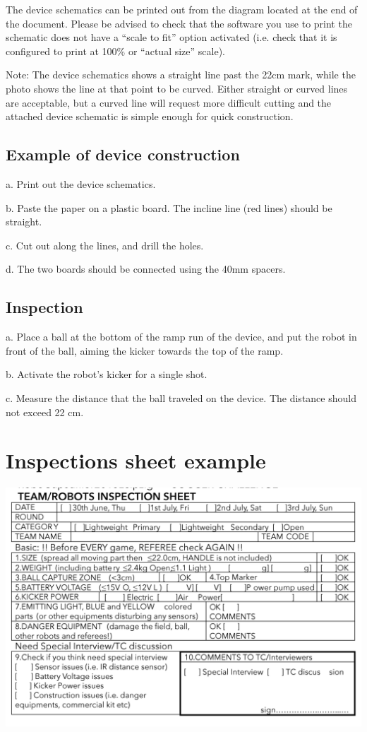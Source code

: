 \documentclass{article}
\begin{document}
The device schematics can be printed out from the diagram located at the end of the document. Please be advised to check that the software you use to print the schematic does not have a ``scale to fit'' option activated (i.e. check that it is configured to print at 100\% or ``actual size'' scale).

Note: The device schematics shows a straight line past the 22cm mark, while the photo shows the line at that point to be curved. Either straight or curved lines are acceptable, but a curved line will request more difficult cutting and the attached device schematic is simple enough for quick construction.

\subsection{Example of device construction}

a. Print out the device schematics.

b. Paste the paper on a plastic board. The incline line (red lines) should be straight.

c. Cut out along the lines, and drill the holes.

d. The two boards should be connected using the 40mm spacers.

\subsection{Inspection}

a. Place a ball at the bottom of the ramp run of the device, and put the robot in front of the ball, aiming the kicker towards the top of the ramp.

b. Activate the robot's kicker for a single shot.

c. Measure the distance that the ball traveled on the device. The distance should not exceed 22 cm.


\section{Inspections sheet example\label{ref-065}}

\includegraphics[width=1\textwidth]{media/image10.png}
\end{document}
